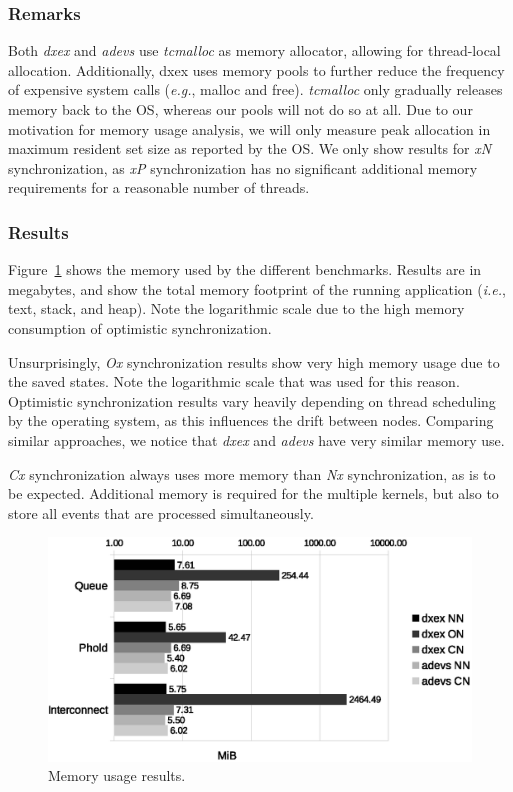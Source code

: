 \subsubsection{Remarks}
Both \textit{dxex} and \textit{adevs} use \textit{tcmalloc} as memory allocator, allowing for thread-local allocation.
Additionally, dxex uses memory pools to further reduce the frequency of expensive system calls (\textit{e.g.}, malloc and free).
\textit{tcmalloc} only gradually releases memory back to the OS, whereas our pools will not do so at all.
Due to our motivation for memory usage analysis, we will only measure peak allocation in maximum resident set size as reported by the OS.
We only show results for \textit{xN} synchronization, as \textit{xP} synchronization has no significant additional memory requirements for a reasonable number of threads.

\subsubsection{Results}
Figure~\ref{fig:memory} shows the memory used by the different benchmarks.
Results are in megabytes, and show the total memory footprint of the running application (\textit{i.e.}, text, stack, and heap).
Note the logarithmic scale due to the high memory consumption of optimistic synchronization.

Unsurprisingly, \textit{Ox} synchronization results show very high memory usage due to the saved states.
Note the logarithmic scale that was used for this reason.
Optimistic synchronization results vary heavily depending on thread scheduling by the operating system, as this influences the drift between nodes. 
Comparing similar approaches, we notice that \textit{dxex} and \textit{adevs} have very similar memory use.

\textit{Cx} synchronization always uses more memory than \textit{Nx} synchronization, as is to be expected.
Additional memory is required for the multiple kernels, but also to store all events that are processed simultaneously.

\begin{figure}
    \includegraphics[width=\columnwidth]{fig/memory_voorlopig.eps}
    \caption{Memory usage results.}
    \label{fig:memory}
\end{figure}

